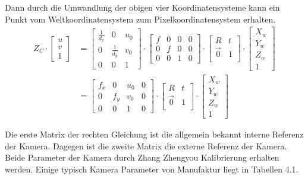 Dann durch die Umwandlung der obigen vier Koordinatensysteme kann ein Punkt vom Weltkoordinatensystem zum Pixelkoordinatensystem erhalten.
\begin{equation}
\begin{split}
   Z_C \cdot \begin{bmatrix}
	u \\  
	v \\
	1
	\end{bmatrix} & = \begin{bmatrix}
	\frac{1}{d_x} 			& 0 			& u_0	\\
	0	 					& \frac{1}{d_y} & v_0	\\
	0     					& 0 			& 1	
	\end{bmatrix} \cdot \begin{bmatrix}
	f & 0 & 0 & 0	\\
	0 & f & 0 & 0	\\
	0 & 0 & 1 & 0	
	\end{bmatrix} \cdot \begin{bmatrix}
	R & t	\\
	\vec{0}	& 1 \\
	\end{bmatrix} \cdot \begin{bmatrix}
	X_w \\  
	Y_w \\
	Z_w \\
	1
	\end{bmatrix} \\
	& = \begin{bmatrix}
	f_x & 0 & u_0 & 0	\\
	0 & f_y & v_0 & 0	\\
	0 & 0 & 1 & 0	
	\end{bmatrix} \cdot \begin{bmatrix}
	R & t	\\
	\vec{0}	& 1 \\
	\end{bmatrix} \cdot \begin{bmatrix}
	X_w \\  
	Y_w \\
	Z_w \\
	1
	\end{bmatrix}
\end{split}	
\end{equation}

Die erste Matrix der rechten Gleichung ist die allgemein bekannt interne Referenz der Kamera. Dagegen ist die zweite Matrix die externe Referenz der Kamera. Beide Parameter der Kamera durch Zhang Zhengyou \cite{zhangzhengyou} Kalibrierung erhalten werden. Einige typisch Kamera Parameter von Manufaktur liegt in Tabellen 4.1.

